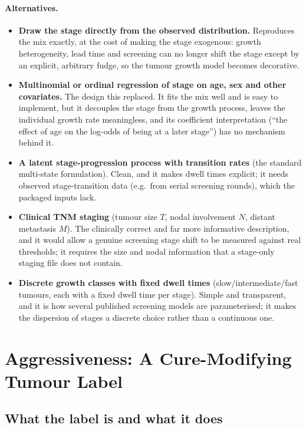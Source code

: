 \documentclass[12pt,a4paper]{article}
\newcommand{\alt}[1]{\paragraph{Alternatives.} #1}
\begin{document}
\alt{\begin{itemize}[nosep]
  \item \textbf{Draw the stage directly from the observed distribution.} Reproduces the mix exactly, at the
        cost of making the stage exogenous: growth heterogeneity, lead time and screening can no longer
        shift the stage except by an explicit, arbitrary fudge, so the tumour growth model becomes
        decorative.
  \item \textbf{Multinomial or ordinal regression of stage on age, sex and other covariates.} The design
        this replaced. It fits the mix well and is easy to implement, but it decouples the stage from the
        growth process, leaves the individual growth rate meaningless, and its coefficient interpretation
        (``the effect of age on the log-odds of being at a later stage'') has no mechanism behind it.
  \item \textbf{A latent stage-progression process with transition rates} (the standard multi-state
        formulation). Clean, and it makes dwell times explicit; it needs observed stage-transition data
        (e.g.\ from serial screening rounds), which the packaged inputs lack.
  \item \textbf{Clinical TNM staging} (tumour size $T$, nodal involvement $N$, distant metastasis $M$).
        The clinically correct and far more informative description, and it would allow a genuine
        screening stage shift to be measured against real thresholds; it requires the size and nodal
        information that a stage-only staging file does not contain.
  \item \textbf{Discrete growth classes with fixed dwell times} (slow/intermediate/fast tumours,
        each with a fixed dwell time per stage). Simple and transparent, and it is how several published
        screening models are parameterised; it makes the dispersion of stages a discrete choice rather
        than a continuous one.
\end{itemize}}

\section{Aggressiveness: A Cure-Modifying Tumour Label}
\label{sec:agg}

\subsection{What the label is and what it does}
\end{document}
